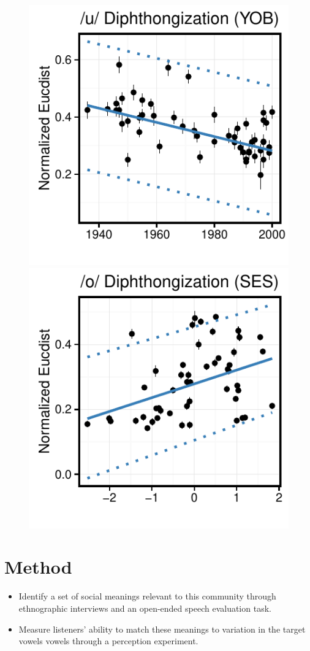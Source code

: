 \documentclass[a0,final]{a0poster}
\begin{document}
\begin{multicols}{4}
\begin{figure}[H]
\includegraphics[scale=1.65]{u_dip_yob.pdf}\includegraphics[scale=1.65]{o_dip_soc.pdf}
\end{figure}
\columnbreak
\section*{Method}
\begin{itemize}
\item{Identify a set of social meanings relevant to this community through ethnographic interviews and an open-ended speech evaluation task.}
\item{Measure listeners' ability to match these meanings to variation in the target vowels vowels through a perception experiment.}
\end{itemize}


\end{multicols}
\end{document}
